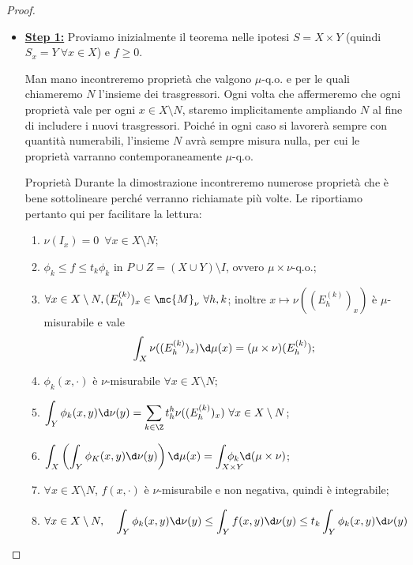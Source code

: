 \begin{proof}~
    \begin{itemize}
        \item \textbf{\underline{Step 1:}} Proviamo inizialmente il teorema nelle ipotesi $S=X\times Y$ (quindi $S_x=Y\ \forall x\in X$) e $f\geq 0$.
        \begin{textbox}{\faExclamationTriangle}
            Man mano incontreremo proprietà che valgono $\mu$-q.o. e per le quali chiameremo $N$ l'insieme dei trasgressori. Ogni volta che affermeremo che ogni proprietà vale per ogni $x\in X\setminus N$, staremo implicitamente ampliando $N$ al fine di includere i nuovi trasgressori. Poiché in ogni caso si lavorerà sempre con quantità numerabili, l'insieme $N$ avrà sempre misura nulla, per cui le proprietà varranno contemporaneamente $\mu$-q.o.
        \end{textbox}
        \begin{textbox}{Proprietà}
            Durante la dimostrazione incontreremo numerose proprietà che è bene sottolineare perché verranno richiamate più volte. Le riportiamo pertanto qui per facilitare la lettura:
            \begin{enumerate}[label=\eqref{eq:fub: \alph*}]
                \item $\nu(I_x)=0$\ $\forall x \in X\setminus N$;
                \item $\phi_k\leq f\leq t_k\phi_k$ in $P\cup Z=(X\cup Y)\setminus I$, ovvero $\mu\times\nu$-q.o.;
                \item $\forall x\in X\setminus N, (E_h^{(k)})_x\in\mc{M}_\nu \ \forall h,k$; inoltre $x\mapsto \nu((E_h^{(k)})_x)$ è $\mu$-misurabile e vale\[\int_X\nu ((E_h^{(k)})_x)\d\mu(x)=(\mu\times\nu)(E_h^{(k)});\]
                \item $\phi_k(x,\cdot)$ è $\nu$-misurabile $\forall x\in X\setminus N$;
                \item $\displaystyle\int_Y\phi_k(x,y)\d\nu(y)=\sum_{k\in \Z}t_h^h\nu((E_h^{(k)})_x)\ \forall x\in X\setminus N$;
                \item $\displaystyle \int_X\left(\int_Y\phi_K(x,y)\d\nu(y)\right)\d\mu(x) = \int_{X\times Y}\!\!\!\!\!\!\!\!\!\!\phi_k\d(\mu\times \nu)$;
                \item $\forall x\in X\setminus N$, $f(x,\cdot)$ è $\nu$-misurabile e non negativa, quindi è integrabile;
                \item $\displaystyle\forall x \in X\setminus N, \quad \int_Y\phi_k(x,y)\d\nu(y)\leq \int_Yf(x,y)\d\nu(y)\leq t_k\int_Y\phi_k(x,y) \d\nu(y)$

\end{enumerate}
\end{textbox}
\end{itemize}
\end{proof}
